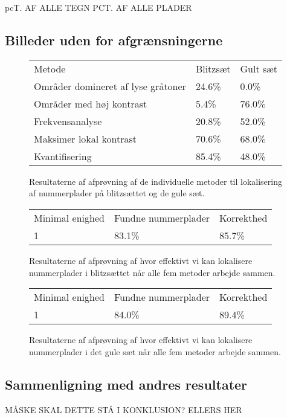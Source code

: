 pcT. AF ALLE TEGN
PCT. AF ALLE PLADER


\subsection{Billeder uden for afgrænsningerne}

\begin{figure}[htp]
\centering
\begin{tabular}{|l|l|l|}
\hline
\rowcolor[gray]{0.9} \multicolumn{3}{|>{\columncolor[gray]{0.9}}c|}{\textbf{..}} \\ \hline
Metode & Blitzsæt & Gult sæt\\ \hline
Områder domineret af lyse gråtoner &  24.6\% & 0.0\%\\ \hline
Områder med høj kontrast & 5.4\% & 76.0\%\\ \hline
Frekvensanalyse &  20.8\% & 52.0\%\\ \hline
Maksimer lokal kontrast &  70.6\% & 68.0\%\\ \hline
Kvantifisering &  85.4\% & 48.0\%\\
\hline
\end{tabular}
\caption{Resultaterne af afprøvning af de individuelle metoder til lokalisering af nummerplader på blitzsættet og de gule sæt.}
\label{fig:test:lokalisering_blitz_gul}
\end{figure}

\begin{figure}[htp]
\centering
  \begin{tabular}{|l|l|l|}
    \hline
    \rowcolor[gray]{0.9} \multicolumn{3}{|>{\columncolor[gray]{0.9}}c|}{\textbf{Blitzsæt}} \\
    \hline
    Minimal enighed & Fundne nummerplader & Korrekthed\\ \hline
    1 &  83.1\% & 85.7\%\\ \hline
  \end{tabular}
\caption{Resultaterne af afprøvning af hvor effektivt vi kan lokalisere nummerplader i blitzsættet når alle fem metoder arbejde sammen.}
\label{fig:test:lokalisering_blitz_samlet}
\end{figure}


\begin{figure}[htp]
\centering
  \begin{tabular}{|l|l|l|}
    \hline
    \rowcolor[gray]{0.9} \multicolumn{3}{|>{\columncolor[gray]{0.9}}c|}{\textbf{Gult sæt}} \\
    \hline
    Minimal enighed & Fundne nummerplader & Korrekthed\\ \hline
    1 &  84.0\% & 89.4\%\\ \hline
  \end{tabular}
\caption{Resultaterne af afprøvning af hvor effektivt vi kan lokalisere nummerplader i det gule sæt når alle fem metoder arbejde sammen.}
\label{fig:test:lokalisering_gul_samlet}
\end{figure}




\subsection{Sammenligning med andres resultater}


MÅSKE SKAL DETTE STÅ I KONKLUSION? ELLERS HER
